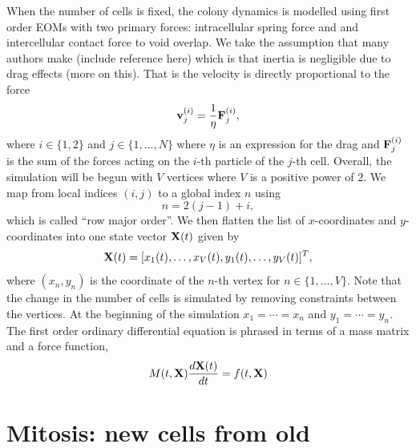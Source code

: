 When the number of cells is fixed, the colony dynamics is modelled
using first order EOMs with two primary forces: intracellular spring force and
and intercellular contact force to void overlap. We take the assumption that 
many authors make (include reference here) which is that inertia is negligible
due to drag effects (more on this). That is the velocity is directly
proportional to the force
\begin{equation*}
\vb{v}_j^{(i)} = \frac{1}{\eta} \vb{F}_j^{(i)},
\end{equation*}
where $i \in \{1,2\}$ and $j \in \{1, \ldots, N\}$ where $\eta$ is an expression for
the drag and $\vb{F}_j^{(i)}$ is the sum of the forces acting on the $i$-th particle of
the $j$-th cell. Overall, the simulation will be begun with $V$ vertices where $V$ is a
positive power of $2$. We map from local indices $(i,j)$ to a global index $n$ using
\begin{equation*}
    n = 2(j-1) +i,
\end{equation*}
which is called ``row major order''. We then flatten the list of $x$-coordinates and 
$y$-coordinates into one state vector $\vb{X}(t)$ given by
\begin{equation*}
    \vb{X}(t) = [x_1(t), \ldots, x_V(t), y_1(t), \ldots, y_V(t)]^T,
\end{equation*}
where $(x_n,y_n)$ is the coordinate of the $n$-th vertex for $n \in \{1,\ldots,V\}$.
Note that the change in the number of cells is simulated by removing constraints
between the vertices. At the beginning of the simulation $x_1 = \cdots = x_n$ and
$y_1 = \cdots = y_n$. The first order ordinary differential equation is phrased
in terms of a mass matrix and a force function,
\begin{equation*}
    M(t,\vb{X})\frac{d \vb{X} (t)}{dt} = f(t,\vb{X})
\end{equation*}


\section{Mitosis: new cells from old}

